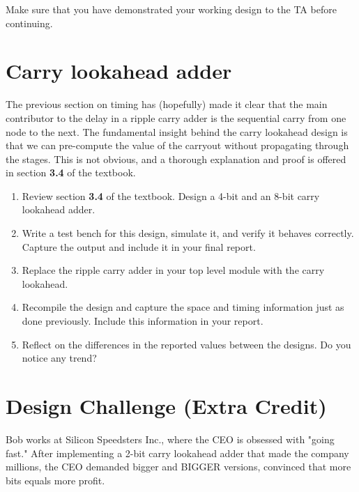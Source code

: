 \documentclass[12pt]{labmanual}
\begin{document}
\hfill\break

\begin{important}[frametitle={TA Checkoff}]
    Make sure that you have demonstrated your working design to the TA before continuing.
\end{important}



\section{Carry lookahead adder}
The previous section on timing has (hopefully) made it clear that the main contributor to the delay in a ripple carry adder is the sequential carry from one node to the next. The fundamental insight behind the carry lookahead design is that we can pre-compute the value of the carryout without propagating through the stages. This is not obvious, and a thorough explanation and proof is offered in section \textbf{3.4} of the textbook.
\hfill\break
\begin{question}
\begin{enumerate}
    \item Review section \textbf{3.4} of the textbook. Design a 4-bit and an 8-bit carry lookahead adder.
    \item Write a test bench for this design, simulate it, and verify it behaves correctly. Capture the output and include it in your final report.
    \item Replace the ripple carry adder in your top level module with the carry lookahead.
    \item Recompile the design and capture the space and timing information just as done previously. Include this information in your report.
    \item Reflect on the differences in the reported values between the designs. Do you notice any trend?
\end{enumerate}
    
\end{question}


\section{Design Challenge (Extra Credit)}
Bob works at Silicon Speedsters Inc., where the CEO is obsessed with "going fast." After implementing a 2-bit carry lookahead adder that made the company millions, the CEO demanded bigger and BIGGER versions, convinced that more bits equals more profit.
\end{document}

